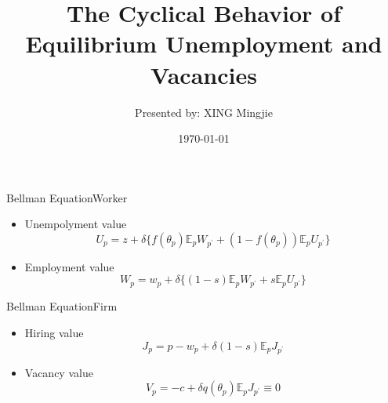 \documentclass{beamer}
\title{The Cyclical Behavior of Equilibrium Unemployment and Vacancies\\
\citet{Shimer2005}}
\author{Presented by: XING Mingjie}
\date{\today}
\begin{document}

\begin{frame}
  \titlepage
\end{frame}

\begin{frame}{Bellman Equation}{Worker}
    \begin{itemize}
        \item Unempolyment value
            \begin{equation}\label{BellmanUnemploy}
                U_p = z + \delta \{f(\theta_p)\mathbb{E}_p W_{p^\prime} + (1-f(\theta_p))\mathbb{E}_p U_{p^\prime}\}
            \end{equation}
        \item Employment value
            \begin{equation}\label{BellmanEmploy}
                W_p = w_p + \delta \{(1-s)\mathbb{E}_p W_{p^\prime} + s\mathbb{E}_p U_{p^\prime}\}
            \end{equation}
    \end{itemize}
\end{frame}

\begin{frame}{Bellman Equation}{Firm}
    \begin{itemize}
        \item Hiring value
            \begin{equation}\label{BellmanHire}
                J_p = p - w_p + \delta (1-s)\mathbb{E}_p J_{p^\prime}
            \end{equation}
        \item Vacancy value
            \begin{equation}\label{BellmanVacancy}
                V_p = -c + \delta q(\theta_p)\mathbb{E}_p J_{p^\prime} \equiv 0
            \end{equation}
    \end{itemize}
\end{frame}
\end{document}
